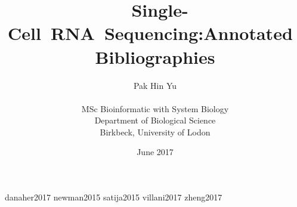 \documentclass{article}
\title{\mbox{  Single-Cell RNA Sequencing:Annotated Bibliographies}}
\author{ {\LARGE Pak Hin Yu} \\\\ MSc Bioinformatic with System Biology \\ Department of Biological Science\\ Birkbeck, University of Lodon}
\date{June 2017}
\begin{document}
\maketitle
\clearpage 
{danaher2017}
\clearpage 
{newman2015}
\clearpage 
{satija2015}
\clearpage 
{villani2017}
\clearpage 
{zheng2017}
\end{document}
